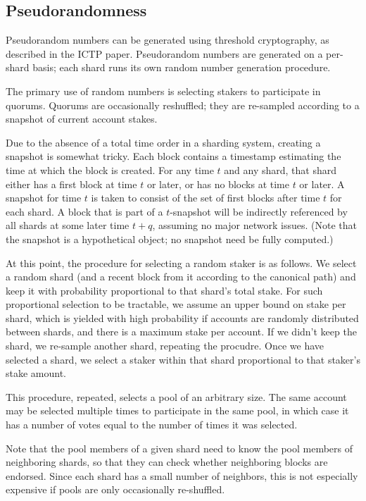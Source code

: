 \documentclass{article}
\begin{document}
\subsection{Pseudorandomness}

Pseudorandom numbers can be generated using threshold cryptography, as
described in the ICTP paper.  Pseudorandom numbers are generated on a per-shard
basis; each shard runs its own random number generation procedure.

The primary use of random numbers is selecting stakers to participate in
quorums.  Quorums are occasionally reshuffled; they are re-sampled according to
a snapshot of current account stakes.

Due to the absence of a total time order in a sharding system, creating a
snapshot is somewhat tricky.  Each block contains a timestamp estimating
the time at which the block is created.  For any time $t$ and any shard,
that shard either has a first block at time $t$ or later, or has no blocks
at time $t$ or later.  A snapshot for time $t$ is taken to consist of the
set of first blocks after time $t$ for each shard.  A block that is part
of a $t$-snapshot will be indirectly referenced by all shards at some later
time $t+q$, assuming no major network issues.  (Note that the snapshot is
a hypothetical object; no snapshot need be fully computed.)

At this point, the procedure for selecting a random staker is as follows.  We
select a random shard (and a recent block from it according to the canonical
path) and keep it with probability proportional to that shard's total stake.
For such proportional selection to be tractable, we assume an upper bound on
stake per shard, which is yielded with high probability if accounts are
randomly distributed between shards, and there is a maximum stake per account.
If we didn't keep the shard, we re-sample another shard, repeating the
procudre.  Once we have selected a shard, we select a staker within that shard
proportional to that staker's stake amount.

This procedure, repeated, selects a pool of an arbitrary size.  The same account
may be selected multiple times to participate in the same pool, in which case it
has a number of votes equal to the number of times it was selected.

Note that the pool members of a given shard need to know the pool members of
neighboring shards, so that they can check whether neighboring blocks are
endorsed.  Since each shard has a small number of neighbors, this is
not especially expensive if pools are only occasionally re-shuffled.
\end{document}
